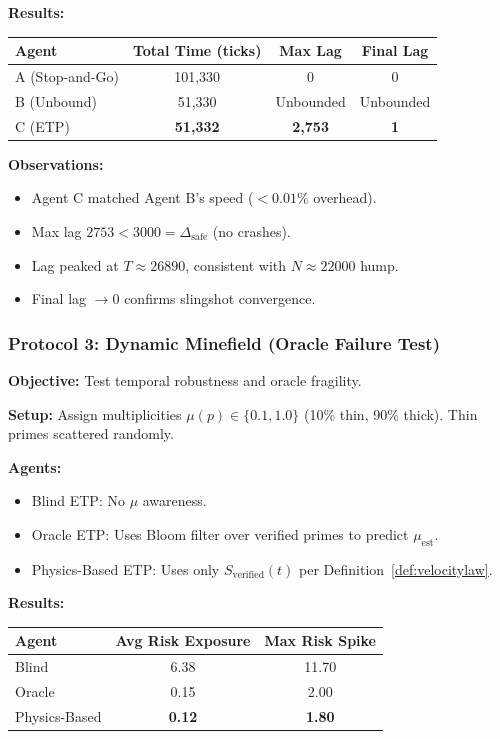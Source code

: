 \documentclass[12pt,a4paper]{article}
\begin{document}
\textbf{Results:}
\begin{center}
\begin{tabular}{lccc}
\toprule
Agent & Total Time (ticks) & Max Lag & Final Lag \\
\midrule
A (Stop-and-Go) & 101,330 & 0 & 0 \\
B (Unbound) & 51,330 & Unbounded & Unbounded \\
C (ETP) & \textbf{51,332} & \textbf{2,753} & \textbf{1} \\
\bottomrule
\end{tabular}
\end{center}

\textbf{Observations:}
\begin{itemize}
\item Agent C matched Agent B's speed ($<0.01\%$ overhead).
\item Max lag $2753 < 3000 = \Delta_{\text{safe}}$ (no crashes).
\item Lag peaked at $T \approx 26890$, consistent with $N \approx 22000$ hump.
\item Final lag $\to 0$ confirms slingshot convergence.
\end{itemize}

\subsubsection{Protocol 3: Dynamic Minefield (Oracle Failure Test)}

\textbf{Objective:} Test temporal robustness and oracle fragility.

\textbf{Setup:} Assign multiplicities $\mu(p) \in \{0.1, 1.0\}$ (10\% thin, 90\% thick). Thin primes scattered randomly.

\textbf{Agents:}
\begin{itemize}
\item Blind ETP: No $\mu$ awareness.
\item Oracle ETP: Uses Bloom filter over verified primes to predict $\mu_{\text{est}}$.
\item Physics-Based ETP: Uses only $S_{\text{verified}}(t)$ per Definition~\ref{def:velocitylaw}.
\end{itemize}

\textbf{Results:}
\begin{center}
\begin{tabular}{lcc}
\toprule
Agent & Avg Risk Exposure & Max Risk Spike \\
\midrule
Blind & 6.38 & 11.70 \\
Oracle & 0.15 & 2.00 \\
Physics-Based & \textbf{0.12} & \textbf{1.80} \\
\bottomrule
\end{tabular}
\end{center}
\end{document}
